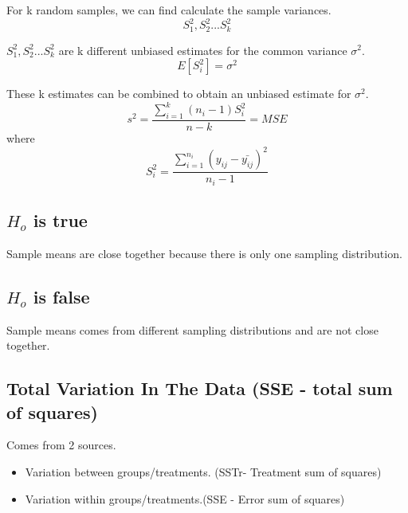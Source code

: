 \documentclass{article}
\begin{document}
            For k random samples, we can find calculate the sample variances.
            \begin{equation*}
                S_{1}^{2}, S_{2}^{2}...S_{k}^{2}
            \end{equation*}

            $S_{1}^{2}, S_{2}^{2}...S_{k}^{2}$ are k different 
            unbiased estimates for the common variance $\sigma^{2}$.
            \begin{equation*}
                E[S_{i}^{2}] = \sigma^{2}
            \end{equation*}
          
            These k estimates can be combined to obtain an 
            unbiased estimate for $\sigma^{2}$.
            \begin{equation*}
                s^{2} = \frac{\sum_{i=1}^{k} (n_{i}-1)S_{i}^{2}}{n-k} = MSE
            \end{equation*}
            where
            \begin{equation*}
                S_{i}^{2} = \frac{\sum_{i=1}^{n_{i}} (y_{ij} - \bar{y_{ij}})^{2}}{n_{i} - 1}
            \end{equation*}

            \subsection*{$H_{o}$ is true}
            Sample means are close together because there is only one sampling distribution.

            \subsection*{$H_{o}$ is false}
            Sample means comes from different sampling distributions and are not close together.

            \subsection{Total Variation In The Data (SSE - total sum of squares)}
            Comes from 2 sources.
            \begin{itemize}
                \item Variation between groups/treatments. (SSTr- Treatment sum of squares)
                \item Variation within groups/treatments.(SSE - Error sum of squares)
            \end{itemize}
\end{document}

